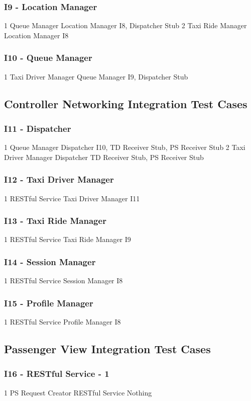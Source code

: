 \subsubsection{I9 - Location Manager}
\testCaseSimpleSimple
	{1}
	{Queue Manager}
	{Location Manager}
	{I8, Dispatcher Stub}
\testCaseSimpleSimple
	{2}
	{Taxi Ride Manager}
	{Location Manager}
	{I8}
\subsubsection{I10 - Queue Manager}
\testCaseSimpleSimple
	{1}
	{Taxi Driver Manager}
	{Queue Manager}
	{I9, Dispatcher Stub}
\subsection{Controller Networking Integration Test Cases}
\subsubsection{I11 - Dispatcher}
\testCaseSimpleSimple
	{1}
	{Queue Manager}
	{Dispatcher}
	{I10, TD Receiver Stub, PS Receiver Stub}
\testCaseSimpleSimple
	{2}
	{Taxi Driver Manager}
	{Dispatcher}
	{TD Receiver Stub, PS Receiver Stub}
\subsubsection{I12 - Taxi Driver Manager}
\testCaseSimpleSimple
	{1}
	{RESTful Service}
	{Taxi Driver Manager}
	{I11}
\subsubsection{I13 - Taxi Ride Manager}
\testCaseSimpleSimple
	{1}
	{RESTful Service}
	{Taxi Ride Manager}
	{I9}
\subsubsection{I14 - Session Manager}
\testCaseSimpleSimple
	{1}
	{RESTful Service}
	{Session Manager}
	{I8}
\subsubsection{I15 - Profile Manager}
\testCaseSimpleSimple
	{1}
	{RESTful Service}
	{Profile Manager}
	{I8}
\subsection{Passenger View Integration Test Cases}
\subsubsection{I16 - RESTful Service - 1}
\testCaseSimpleSimple
	{1}
	{PS Request Creator}
	{RESTful Service}
	{Nothing}
